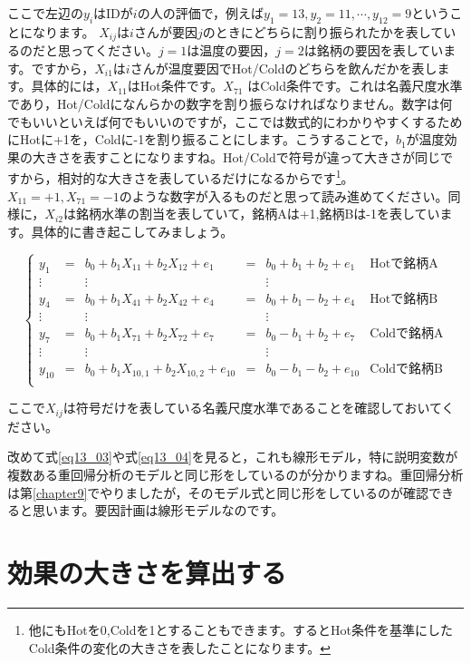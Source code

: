 \documentclass{ltjbook}
\begin{document}
ここで左辺の$y_{i}$はIDが$i$の人の評価で，例えば$y_1=13,y_2=11,\cdots,y_{12}=9$ということになります。
$X_{ij}$は$i$さんが要因$j$のときにどちらに割り振られたかを表しているのだと思ってください。$j=1$は温度の要因，$j=2$は銘柄の要因を表しています。ですから，$X_{i1}$は$i$さんが温度要因でHot/Coldのどちらを飲んだかを表します。具体的には，$X_{11}$はHot条件です。$X_{71}$ はCold条件です。これは名義尺度水準であり，Hot/Coldになんらかの数字を割り振らなければなりません。数字は何でもいいといえば何でもいいのですが，ここでは数式的にわかりやすくするためにHotに+1を，Coldに-1を割り振ることにします。こうすることで，$b_1$が温度効果の大きさを表すことになりますね。Hot/Coldで符号が違って大きさが同じですから，相対的な大きさを表しているだけになるからです\footnote{他にもHotを0,Coldを1とすることもできます。するとHot条件を基準にしたCold条件の変化の大きさを表したことになります。}。$X_{11}=+1,X_{71}=-1$のような数字が入るものだと思って読み進めてください。同様に，$X_{i2}$は銘柄水準の割当を表していて，銘柄Aは+1,銘柄Bは-1を表しています。具体的に書き起こしてみましょう。


\[
\label{eq13_04}
\left \{
  \begin{array}{cccccc}
    y_1 &=& b_0 + b_1 X_{11} + b_2 X_{12} + e_1 &=& b_0 + b_1 + b_2 + e_1 & \mbox{Hotで銘柄A}\\
    \vdots& & \vdots && \vdots & \\
    y_4 &=& b_0 + b_1 X_{41} + b_2 X_{42} + e_4 &=& b_0 + b_1 - b_2 + e_4 & \mbox{Hotで銘柄B}\\
    \vdots& & \vdots && \vdots & \\
    y_7 &=& b_0 + b_1 X_{71} + b_2 X_{72} + e_7 &=& b_0 - b_1 + b_2 + e_7 & \mbox{Coldで銘柄A}\\
    \vdots& & \vdots && \vdots &\\
    y_{10} &=& b_0 + b_1 X_{10,1} + b_2 X_{10,2} + e_{10} &=& b_0 - b_1 - b_2 + e_{10} & \mbox{Coldで銘柄B}\\
  \end{array}
\right.
\]

ここで$X_{ij}$は符号だけを表している名義尺度水準であることを確認しておいてください。

改めて式\ref{eq13_03}や式\ref{eq13_04}を見ると，これも線形モデル，特に説明変数が複数ある重回帰分析のモデルと同じ形をしているのが分かりますね。重回帰分析は第\ref{chapter9}でやりましたが，そのモデル式と同じ形をしているのが確認できると思います。要因計画は線形モデルなのです。


\section{効果の大きさを算出する}
\end{document}

